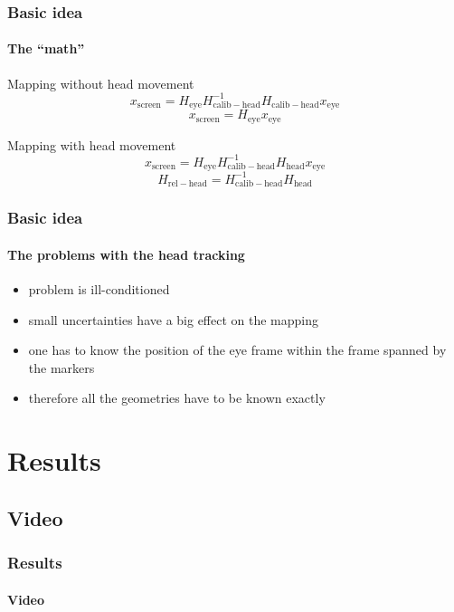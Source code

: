 \documentclass[%
14pt
]{beamer}
\begin{document}
\begin{frame}
	\frametitle{Basic idea}
  \framesubtitle{The ``math''}
  \begin{block}{Mapping without head movement}
    \begin{equation*}
      x_\mathrm{screen} = H_\mathrm{eye} H_\mathrm{calib-head} ^{-1} H_\mathrm{calib-head} x_\mathrm{eye}
    \end{equation*}
    \begin{equation*}
      x_\mathrm{screen} = H_\mathrm{eye}  x_\mathrm{eye}
    \end{equation*}
  \end{block}\pause
  \begin{block}{Mapping with head movement}
    \begin{equation*}
      x_\mathrm{screen} = H_\mathrm{eye} H_\mathrm{calib-head} ^{-1} H_\mathrm{head} x_\mathrm{eye}
    \end{equation*}
    \begin{equation*}
      H_\mathrm{rel-head} = H_\mathrm{calib-head}^{-1} H_\mathrm{head}
    \end{equation*}
  \end{block}
\end{frame}

\begin{frame}
	\frametitle{Basic idea}
  \framesubtitle{The problems with the head tracking}
  \begin{itemize}
    \item problem is ill-conditioned
    \item small uncertainties have a big effect on the mapping
    \item one has to know the position of the eye frame within the frame spanned by the markers
    \item therefore all the geometries have to be known exactly
  \end{itemize}
\end{frame}

\section{Results}
\subsection{Video}
\begin{frame}
	\frametitle{Results}
  \framesubtitle{Video}
\end{frame}
\end{document}

